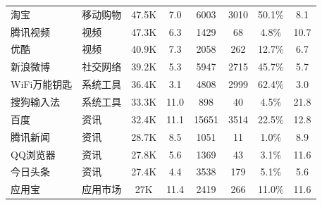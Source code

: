 \begin{ThreePartTable}
\begin{longtable}{l l c c c c c c}
        淘宝                            & 移动购物   & 47.5K                      & 7.0                        & 6003           & 3010                       & 50.1\%       & 8.1                        \\
        \rowcolor{gray!15} 腾讯视频     & 视频       & 47.3K                      & 6.3                        & 1429           & 68                         & 4.8\%        & 10.7                       \\
        优酷                            & 视频       & 40.9K                      & 7.3                        & 2058           & 262                        & 12.7\%       & 6.7                        \\
        新浪微博                        & 社交网络   & 39.2K                      & 5.3                        & 5947           & 2715                       & 45.7\%       & 5.7                        \\
        \rowcolor{gray!15} WiFi万能钥匙 & 系统工具   & 36.4K                      & 3.1                        & 4808           & 2999                       & 62.4\%       & 3.0                        \\
        搜狗输入法                      & 系统工具   & 33.3K                      & 11.0                       & 898            & 40                         & 4.5\%        & 21.8                       \\
        \rowcolor{gray!15} 百度         & 资讯       & 32.4K                      & 11.1                       & 15651          & 3514                       & 22.5\%       & 12.8                       \\
        腾讯新闻                        & 资讯       & 28.7K                      & 8.5                        & 1051           & 11                         & 1.0\%        & 8.9                        \\
        \rowcolor{gray!15} QQ浏览器     & 资讯       & 27.8K                      & 5.6                        & 1369           & 43                         & 3.1\%        & 11.6                       \\
        今日头条                        & 资讯       & 27.4K                      & 4.4                        & 3538           & 179                        & 5.1\%        & 5.6                        \\
        \rowcolor{gray!15} 应用宝       & 应用市场   & 27K                        & 11.4                       & 2419           & 266                        & 11.0\%       & 11.6                       \\

\end{longtable}
\end{ThreePartTable}
